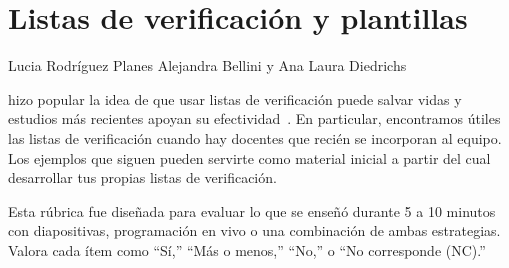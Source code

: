 \chapter{Listas de verificación y plantillas}\label{s:checklist}

\begin{reveiwer}
{Lucia Rodríguez Planes}
{Alejandra Bellini y Ana Laura Diedrichs}
\end{reveiwer}
 	

\cite{Gawa2007} hizo popular la idea de que usar listas de verificación puede salvar vidas
y estudios más recientes apoyan su efectividad~\cite{Avel2013,Urba2014,Rams2019}.
En particular, encontramos útiles las listas de verificación
cuando hay docentes que recién se incorporan al equipo.
Los ejemplos que siguen pueden servirte como material inicial a partir del cual desarrollar tus propias listas de verificación.


Esta rúbrica fue diseñada para evaluar lo que se enseñó durante 5 a 10 minutos
con diapositivas, programación en vivo o una combinación de ambas estrategias.
Valora cada ítem como ``Sí,'' ``Más o menos,'' ``No,'' o ``No corresponde (NC).''

